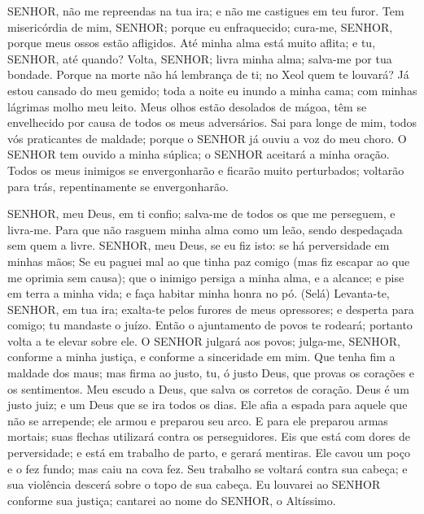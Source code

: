 
{\PP 
  SENHOR, não me repreendas na tua ira; e não me castigues em teu furor.
  Tem misericórdia de mim, SENHOR; porque eu
{} enfraquecido; cura-me, SENHOR, porque meus ossos estão afligidos.
  Até minha alma está muito aflita; e tu, SENHOR, até quando?
  Volta, SENHOR; livra minha alma; salva-me por tua bondade.
  Porque na morte não há lembrança de ti; no Xeol
 quem te louvará?
  Já estou cansado do meu gemido; toda a noite eu inundo a minha cama; com minhas lágrimas molho meu leito.
  Meus olhos estão desolados de mágoa,
{} têm se envelhecido por causa de todos os meus adversários.
  Sai para longe de mim, todos vós praticantes de maldade; porque o SENHOR já ouviu a voz do meu choro.
  O SENHOR tem ouvido a minha súplica; o SENHOR aceitará a minha oração.
  Todos os meus inimigos se envergonharão e ficarão muito perturbados; voltarão para trás,
{} repentinamente se envergonharão.
\par }


{\PP 
  SENHOR, meu Deus, em ti confio; salva-me de todos os que me perseguem, e livra-me.
  Para que não rasguem minha alma como um leão, sendo despedaçada sem
{} quem a livre.
  SENHOR, meu Deus, se eu fiz isto: se há perversidade em minhas mãos;
  Se eu paguei
{} mal ao que tinha paz comigo (mas fiz escapar ao que me oprimia sem causa);
   que o inimigo persiga a minha alma, e a alcance; e pise em terra a minha vida; e faça habitar minha honra no pó. (Selá)
  Levanta-te, SENHOR, em tua ira; exalta-te pelos furores de meus opressores; e desperta para comigo; tu mandaste o juízo.
  Então o ajuntamento de povos te rodeará; portanto volta a te elevar
{} sobre ele.
  O SENHOR julgará aos povos; julga-me, SENHOR, conforme a minha justiça, e conforme a sinceridade
{} em mim.
  Que tenha fim a maldade dos maus; mas firma ao justo, tu, ó justo Deus, que provas os corações e os sentimentos.
  Meu escudo
{} a Deus, que salva os corretos de coração.
  Deus é um justo juiz; e um Deus que se ira todos os dias.
  Ele afia a espada para aquele que não se arrepende; ele
{} armou e preparou seu arco.
  E para ele
{} preparou armas mortais; suas flechas utilizará contra os perseguidores.
  Eis que
{} está com dores de perversidade; e está em trabalho de parto, e gerará mentiras.
  Ele cavou um poço e o fez fundo; mas caiu na cova
{} fez.
  Seu trabalho se voltará contra sua
{} cabeça; e sua violência descerá sobre o topo de sua cabeça.
  Eu louvarei ao SENHOR conforme sua justiça; cantarei ao nome do SENHOR, o Altíssimo.
\par }

